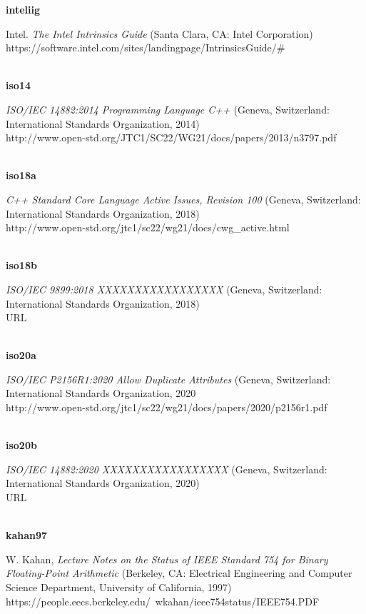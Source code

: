 \noindent\textbf{inteliig}\\
\hspace*{2em}\parbox[t]{\textwidth}{Intel. \textit{The Intel Intrinsics Guide} (Santa Clara, CA: Intel Corporation)\\
https://software.intel.com/sites/landingpage/IntrinsicsGuide/\#}\\

\noindent\textbf{iso14}\\
\hspace*{2em}\parbox[t]{\textwidth}{\textit{ISO/IEC 14882:2014 Programming Language C++} (Geneva, Switzerland: International Standards Organization, 2014)\\ 
http://www.open-std.org/JTC1/SC22/WG21/docs/papers/2013/n3797.pdf}\\

\noindent\textbf{iso18a}\\
\hspace*{2em}\parbox[t]{\textwidth}{\textit{C++ Standard Core Language Active Issues, Revision 100} (Geneva, Switzerland: International Standards Organization, 2018)\\
http://www.open-std.org/jtc1/sc22/wg21/docs/cwg\_active.html}\\

\noindent\textbf{iso18b}\\
\hspace*{2em}\parbox[t]{\textwidth}{\textit{ISO/IEC 9899:2018 XXXXXXXXXXXXXXXXX} (Geneva, Switzerland: International Standards Organization, 2018)\\ 
URL}\\

\noindent\textbf{iso20a}\\
\hspace*{2em}\parbox[t]{\textwidth}{\textit{ISO/IEC P2156R1:2020 Allow Duplicate Attributes} (Geneva, Switzerland: International Standards Organization, 2020\\
http://www.open-std.org/jtc1/sc22/wg21/docs/papers/2020/p2156r1.pdf}\\

\noindent\textbf{iso20b}\\
\hspace*{2em}\parbox[t]{\textwidth}{\textit{ISO/IEC 14882:2020 XXXXXXXXXXXXXXXXX} (Geneva, Switzerland: International Standards Organization, 2020)\\ 
URL}\\

\noindent\textbf{kahan97}\\
\hspace*{2em}\parbox[t]{\textwidth}{W. Kahan, \textit{Lecture Notes on the Status of IEEE Standard 754 for Binary Floating-Point Arithmetic} (Berkeley, CA: Electrical Engineering and Computer Science Department, University of California, 1997)\\
https://people.eecs.berkeley.edu/~wkahan/ieee754status/IEEE754.PDF }\\

